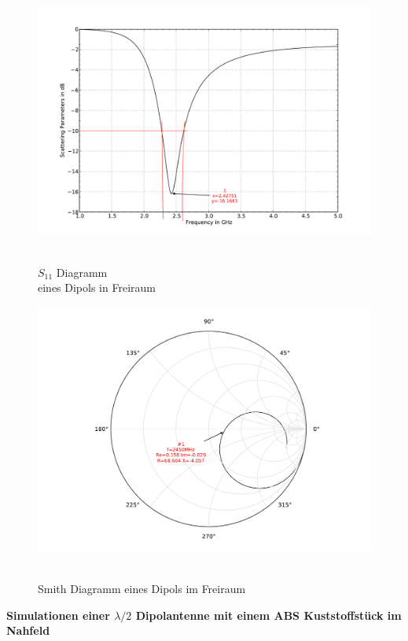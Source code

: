 \begin{figure}[!ht]
\begin{center}
  \includegraphics[width=\linewidth]{content/bilder/Evaluation/Dipol/S11DipolOhneABS.pdf}
  \caption{\\$S_{11}$ Diagramm \\eines Dipols in Freiraum}\label{fig:S11_Dipol_freiraum_1}
\endminipage%
{}
  \includegraphics[width=\linewidth]{content/bilder/Evaluation/Dipol/SmithDipolOhneABS.pdf}
  \caption{\\Smith Diagramm eines Dipols im Freiraum}\label{fig:Smith_Dipol_freiraum_2}
\endminipage
\end{center}
\end{figure}
\textbf{Simulationen einer $\lambda/2$ Dipolantenne mit einem ABS Kuststoffstück im Nahfeld}\\

